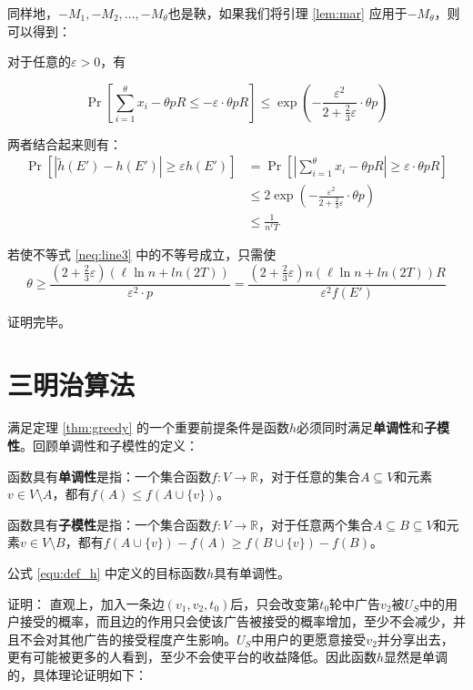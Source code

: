 同样地，$-M_1,-M_2,\ldots,-M_\theta$也是鞅，如果我们将引理 \ref{lem:mar} 应用于$-M_{\theta}$，则可以得到：

对于任意的$\varepsilon>0$，有

\begin{equation}
\Pr\left[\sum_{i=1}^{\theta}x_i- \theta pR \le - \varepsilon \cdot \theta p R\right] \le \exp(-\frac{\varepsilon^2}{2+\frac{2}{3}\varepsilon}\cdot \theta p)
\end{equation}

两者结合起来则有：
\begin{align}
    \Pr[|\tilde{h}(E')-h(E')|\ge \varepsilon h(E')] 
    &=\Pr\left[\left|\sum_{i=1}^{\theta}x_i- \theta pR \right|\ge \varepsilon \cdot \theta p R\right] \\ 
    & \le 2\exp(-\frac{\varepsilon^2}{2+\frac{2}{3}\varepsilon}\cdot \theta p) \\
    & \le \frac{1}{n^{\ell}T} \label{neq:line3}
\end{align}

若使不等式 \ref{neq:line3} 中的不等号成立，只需使
\begin{equation}
\theta \ge \frac{(2+\frac{2}{3}\varepsilon)(\ell\ln n+ln(2T))}{\varepsilon^2\cdot p}=\frac{(2+\frac{2}{3}\varepsilon)n(\ell\ln n+ln(2T)) R}{\varepsilon^2f(E')}
\end{equation}

\noindent 证明完毕。

\section{三明治算法}
\label{sec:sand}
满足定理 \ref{thm:greedy} 的一个重要前提条件是函数$h$必须同时满足{\bfseries 单调性}和{\bfseries 子模性}\cite{nemhauser1978analysis}。回顾单调性和子模性的定义：

函数具有{\bfseries 单调性}是指：一个集合函数$f:V\to \mathbb{R}$，对于任意的集合$A \subseteq V$和元素$v \in V\setminus A$，都有$f(A)\le f(A\cup\{v\})$。

函数具有{\bfseries 子模性}是指：一个集合函数$f:V\to \mathbb{R}$，对于任意两个集合$A\subseteq B \subseteq V$和元素$v \in V \setminus B$，都有$f(A \cup \{v\})-f(A) \ge f(B\cup \{v\})-f(B)$。
\begin{lemma}
\label{lem:h_mon}
公式 \ref{equ:def_h} 中定义的目标函数$h$具有单调性。
\end{lemma}
\noindent 证明：
直观上，加入一条边$(v_1,v_2,t_0)$后，只会改变第$t_0$轮中广告$v_2$被$U_S$中的用户接受的概率，而且边的作用只会使该广告被接受的概率增加，至少不会减少，并且不会对其他广告的接受程度产生影响。$U_S$中用户的更愿意接受$v_2$并分享出去，更有可能被更多的人看到，至少不会使平台的收益降低。因此函数$h$显然是单调的，具体理论证明如下：

